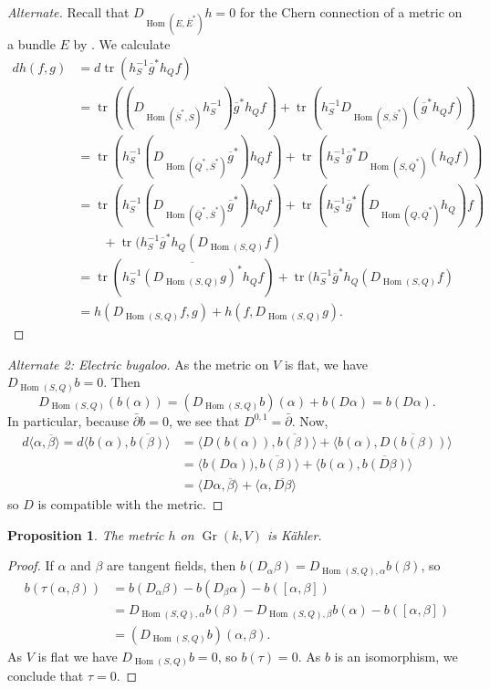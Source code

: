 \documentclass[10pt,a4paper]{article}
\newtheorem{prop}[theo]{Proposition}
\newtheorem*{proof}{Proof}
\def\ov#1{\overline{#1}}
\DeclareMathOperator{\Gr}{Gr}
\DeclareMathOperator{\Hom}{Hom}
\DeclareMathOperator{\tr}{tr}
\begin{document}
\begin{proof}[Alternate]
Recall that $D_{\Hom(E,\ov E^*)}h = 0$ for the Chern connection of a metric on a bundle $E$ by .
We calculate
\begin{align*}
d h(f,g)
&= d \tr(h_S^{-1} \ov g^* h_Q f)
\\
&= \tr((D_{\Hom(\ov S^*, S)} h_S^{-1})\ov g^* h_Q f)
+ \tr(h_S^{-1} D_{\Hom(S,\ov S^*)}(\ov g^* h_Q f))
\\
&= \tr(h_S^{-1} (D_{\Hom(\ov Q^*, \ov S^*)}\ov g^*)  h_Q f)
+ \tr(h_S^{-1} \ov g^* D_{\Hom(S,\ov Q^*)}( h_Q f))
\\
&= \tr(h_S^{-1} (D_{\Hom(\ov Q^*, \ov S^*)}\ov g^*)  h_Q f)
+ \tr(h_S^{-1} \ov g^* (D_{\Hom(Q,\ov Q^*)} h_Q) f)
\\
&\qquad
+ \tr(h_S^{-1} \ov g^*  h_Q (D_{\Hom(S,Q)} f)
\\
&= \tr(h_S^{-1} \ov{(D_{\Hom(S, Q)} g)^*}  h_Q f)
+ \tr(h_S^{-1} \ov g^*  h_Q (D_{\Hom(S,Q)} f)
\\
&= h(D_{\Hom(S,Q)} f, g) + h(f, D_{\Hom(S, Q)} g).
\end{align*}
\end{proof}

\begin{proof}[Alternate 2: Electric bugaloo]
As the metric on $V$ is flat, we have $D_{\Hom(S,Q)}b = 0$. Then
\[
D_{\Hom(S,Q)}(b(\alpha))
= (D_{\Hom(S,Q)}b)(\alpha) + b(D\alpha)
= b(D\alpha).
\]
In particular, because $\bar\partial b = 0$, we see that $D^{0,1} = \bar\partial$.
Now,
\begin{align*}
d\langle \alpha, \ov\beta \rangle
= d \langle b(\alpha), \ov{b(\beta)} \rangle
&= \langle D(b(\alpha)), \ov{b(\beta)} \rangle
+ \langle b(\alpha), \ov{D(b(\beta))} \rangle
\\
&= \langle b(D\alpha)), \ov{b(\beta)} \rangle
+ \langle b(\alpha), \ov{b(D\beta)} \rangle
\\
&= \langle D\alpha, \ov \beta \rangle
+ \langle \alpha, \ov{D\beta} \rangle
\end{align*}
so $D$ is compatible with the metric.
\end{proof}


\begin{prop}
The metric $h$ on $\Gr(k,V)$ is K\"ahler.
\end{prop}

\begin{proof}
If $\alpha$ and $\beta$ are tangent fields, then
\(
b(D_\alpha \beta)
= D_{\Hom(S,Q),\alpha} b(\beta)
\),
so
\begin{align*}
b(\tau(\alpha,\beta))
&= b(D_\alpha\beta) - b(D_\beta\alpha) - b([\alpha,\beta])
\\
&= D_{\Hom(S,Q),\alpha} b(\beta)
- D_{\Hom(S,Q),\beta} b(\alpha)
- b([\alpha,\beta])
\\
&= (D_{\Hom(S,Q)}b)(\alpha,\beta).
\end{align*}
As $V$ is flat we have $D_{\Hom(S,Q)} b = 0$, so $b(\tau) = 0$. As $b$ is an isomorphism, we conclude that $\tau = 0$.
\end{proof}
\end{document}
